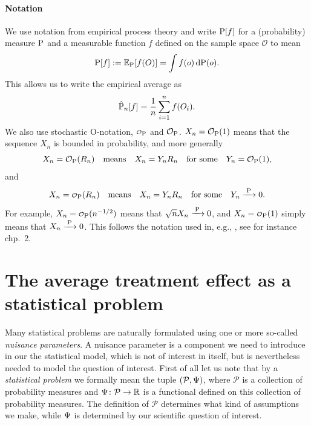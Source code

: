 \documentclass[a4,danish]{article}
\begin{document}
\paragraph{Notation}
We use notation from empirical process theory and write $\P[f]$ for a (probability) measure $\P$ and
a measurable function $f$ defined on the sample space $\mathcal{O}$ to mean
\begin{equation*}
  \P[f] := \E_{\P}[f(O)] = \int f(o) \diff \P(o).
\end{equation*}
This allows us to write the empirical average as
\begin{equation*}
  \empmeas[f] = \frac{1}{n}\sum_{i=1}^{n}f(O_i).
\end{equation*}
We also use stochastic O-notation, $\smallO_{\P}$ and $\mathcal{O}_{\P}$.
$X_n = \mathcal{O}_{\P}(1)$ means that the sequence $X_n$ is bounded in probability, and more
generally
\begin{equation*}
  X_n  = \mathcal{O}_{\P}(R_n)
  \quad \text{means} \quad   X_n  = Y_nR_n
  \quad \text{for some} \quad Y_n  =  \mathcal{O}_{\P}(1),
\end{equation*}
and
\begin{equation*}
  X_n  = \smallO_{\P}(R_n)
  \quad \text{means} \quad   X_n  = Y_nR_n
  \quad \text{for some} \quad Y_n \arrowP 0.
\end{equation*}
For example, $X_n = \smallO_{\P}(n^{-1/2})$ means that $\sqrt{n}X_n \arrowP 0$, and
$X_n = \smallO_{\P}(1)$ simply means that $X_n \arrowP 0$. This follows the notation used in, e.g.,
\cite{van2000asymptotic}, see for instance chp.~2.


\section{The average treatment effect as a statistical problem}
\label{sec:introduction}

Many statistical problems are naturally formulated using one or more
so-called \textit{nuisance parameters}. A nuisance parameter is a
component we need to introduce in our the statistical model, which is
not of interest in itself, but is nevertheless needed to model the
question of interest. First of all let us note that by a
\textit{statistical problem} we formally mean the tuple
$(\mathcal{P}, \TT)$, where $\mathcal{P}$ is a collection of
probability measures and $\TT \colon \mathcal{P} \rightarrow \R$ is a
functional defined on this collection of probability measures. The
definition of $\mathcal{P}$ determines what kind of assumptions we
make, while $\TT$ is determined by our scientific question of
interest.
\end{document}
